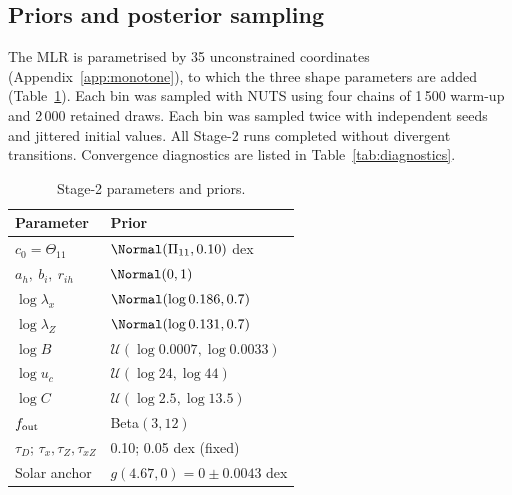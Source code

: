 \subsection{Priors and posterior sampling}
\label{sec:inference}

The MLR is parametrised by 35 unconstrained coordinates
(Appendix~\ref{app:monotone}), to which the three shape parameters are added
(Table~\ref{tab:priors}).  Each bin was sampled with NUTS
\citep{HoffmanGelman2014NUTS} using four chains of 1\,500 warm-up and 2\,000
retained draws.  Each bin was sampled twice with independent seeds and
jittered initial values.  All Stage-2 runs completed without divergent
transitions.  Convergence diagnostics are listed in
Table~\ref{tab:diagnostics}.

\begin{table}
\caption{Stage-2 parameters and priors.}
\label{tab:priors}
\centering
\small
\begin{tabular}{@{}ll@{}}
\toprule
Parameter & Prior \\
\midrule
$c_0=\Theta_{11}$ & $\Normal(\Pi_{11},0.10)$ dex \\
$a_h,\ b_i,\ r_{ih}$ & $\Normal(0,1)$ \\
$\log\lambda_x$ & $\Normal(\log0.186,0.7)$ \\
$\log\lambda_Z$ & $\Normal(\log0.131,0.7)$ \\
$\log B$ & $\mathcal U(\log0.0007,\log0.0033)$ \\
$\log u_c$ & $\mathcal U(\log24,\log44)$ \\
$\log C$ & $\mathcal U(\log2.5,\log13.5)$ \\
$f_{\rm out}$ & Beta$(3,12)$ \\
\midrule
$\tau_D$; $\tau_x,\tau_Z,\tau_{xZ}$ & 0.10; 0.05 dex (fixed) \\
Solar anchor & $g(4.67,0)=0\pm0.0043$ dex \\
\bottomrule
\end{tabular}
\end{table}
